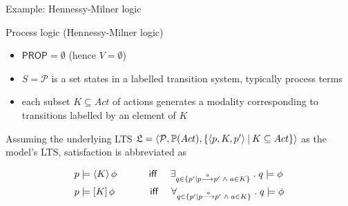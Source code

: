\documentclass[aspectratio=169]{beamer}
\begin{document}
\begin{slide}{Example: Hennessy-Milner logic}\label{s:17}
\small
\begin{block}{Process logic (\alert{Hennessy-Milner logic})}
\begin{itemize}
\item $\mathsf{PROP} = \emptyset$ (hence $V = \emptyset$)
\item $S = \mathcal{P}$ is a set states in a labelled transition system, typically process terms
\item each subset $K \subseteq Act$ of actions generates a modality corresponding to transitions labelled by an element of $K$ 
\end{itemize}
\end{block}
Assuming the underlying LTS \alert{$\mathfrak{L} = \mathopen{\langle}\mathcal{P}, \mathbb{P}(Act), \mathopen{\{} \mathopen{\langle}p ,K, p'\mathclose{\rangle} \mathbin{|} K \subseteq Act \mathclose{\}}\mathclose{\rangle}$} as the model's LTS, satisfaction is abbreviated as
\begin{alertblock}{}
  \vspace*{-4mm}
  \begin{align*}
p & \models \langle K \rangle\, \phi \text{ ~~~~~~~~ \textsf{iff} ~~~}
\exists_{q \in \mathopen{\{} p' \mathbin{|} p \stackrel{a}{\longrightarrow} p' \; \mathbin{\wedge}\;  a \in K \mathclose{\}}}\; .\; q \models \phi \\
p & \models [K]\, \phi \text{~~~~~~~~~~ \textsf{iff} ~~~}
\forall_{q \in \mathopen{\{} p' \mathbin{|} p \stackrel{a}{\longrightarrow} p' \; \mathbin{\wedge}\;  a \in K \mathclose{\}}}\; .\; q \models \phi 
\end{align*}
  \vspace*{-4mm}
\end{alertblock}
\end{slide}
\end{document}
